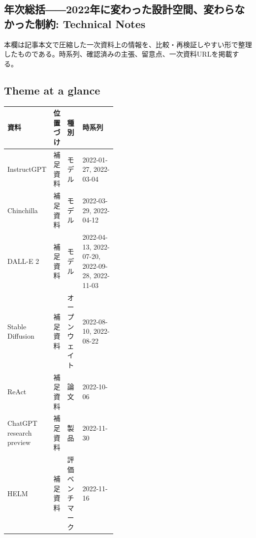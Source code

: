 \subsection*{年次総括――2022年に変わった設計空間、変わらなかった制約: Technical Notes}
本欄は記事本文で圧縮した一次資料上の情報を、比較・再検証しやすい形で整理したものである。時系列、確認済みの主張、留意点、一次資料URLを掲載する。
\smallskip
{}\par
\medskip
\subsection*{Theme at a glance}
\begin{center}
\footnotesize
\begin{tabularx}{\linewidth}{@{}p{0.20\linewidth}p{0.10\linewidth}p{0.14\linewidth}X@{}}
\toprule
資料 & 位置づけ & 種別 & 時系列 \\
\midrule
InstructGPT & 補足資料 & モデル & 2022-01-27, 2022-03-04 \\
Chinchilla & 補足資料 & モデル & 2022-03-29, 2022-04-12 \\
DALL-E 2 & 補足資料 & モデル & 2022-04-13, 2022-07-20, 2022-09-28, 2022-11-03 \\
Stable Diffusion & 補足資料 & オープンウェイト & 2022-08-10, 2022-08-22 \\
ReAct & 補足資料 & 論文 & 2022-10-06 \\
ChatGPT research preview & 補足資料 & 製品 & 2022-11-30 \\
HELM & 補足資料 & 評価ベンチマーク & 2022-11-16 \\
\bottomrule
\end{tabularx}
\end{center}
\normalsize

